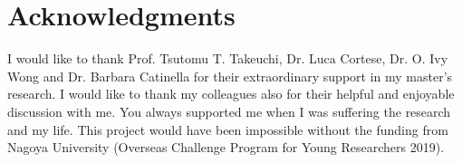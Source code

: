 \chapter*{\Large Acknowledgments}

I would like to thank Prof. Tsutomu T. Takeuchi, Dr. Luca Cortese, Dr. O. Ivy Wong and Dr. Barbara Catinella for their extraordinary support in my master's research.
I would like to thank my colleagues also for their helpful and enjoyable discussion with me.
You always supported me when I was suffering the research and my life.
This project would have been impossible without the funding from Nagoya University (Overseas Challenge Program for Young Researchers 2019).
